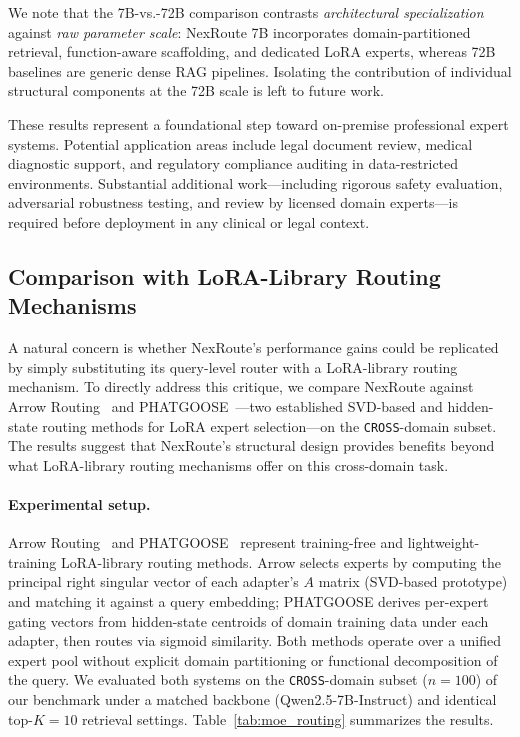 \documentclass[a4paper,fleql,doubleblind]{cas-sc}
\begin{document}
We note that the 7B-vs.-72B comparison contrasts \emph{architectural specialization} against \emph{raw parameter scale}: NexRoute 7B incorporates domain-partitioned retrieval, function-aware scaffolding, and dedicated LoRA experts, whereas 72B baselines are generic dense RAG pipelines. Isolating the contribution of individual structural components at the 72B scale is left to future work.

These results represent a foundational step toward on-premise professional
expert systems. Potential application areas include legal document review,
medical diagnostic support, and regulatory compliance auditing in
data-restricted environments. Substantial additional work---including rigorous
safety evaluation, adversarial robustness testing, and review by licensed
domain experts---is required before deployment in any clinical or legal
context.

\subsection{Comparison with LoRA-Library Routing Mechanisms}
\label{ssec:moe_routing}

A natural concern is whether NexRoute's performance gains could be replicated
by simply substituting its query-level router with a LoRA-library routing
mechanism. To directly address this critique, we
compare NexRoute against Arrow Routing~\citep{arrow2024routing} and
PHATGOOSE~\citep{muqeeth2024phatgoose}---two established SVD-based and
hidden-state routing methods for LoRA expert selection---on the \texttt{CROSS}-domain subset.
The results suggest that NexRoute's structural design provides benefits
beyond what LoRA-library routing mechanisms offer on this cross-domain task.

\paragraph{Experimental setup.}
Arrow Routing~\citep{arrow2024routing} and PHATGOOSE~\citep{muqeeth2024phatgoose}
represent training-free and lightweight-training LoRA-library routing methods.
Arrow selects experts by computing the principal right singular vector of each
adapter's $A$ matrix (SVD-based prototype) and matching it against a query
embedding; PHATGOOSE derives per-expert gating vectors from hidden-state
centroids of domain training data under each adapter, then routes via
sigmoid similarity. Both methods
operate over a unified expert pool without explicit domain partitioning or functional
decomposition of the query. We evaluated both systems on the \texttt{CROSS}-domain
subset ($n{=}100$) of our benchmark under a matched backbone
(Qwen2.5-7B-Instruct) and identical top-$K{=}10$ retrieval settings.
Table~\ref{tab:moe_routing} summarizes the results.
\end{document}
